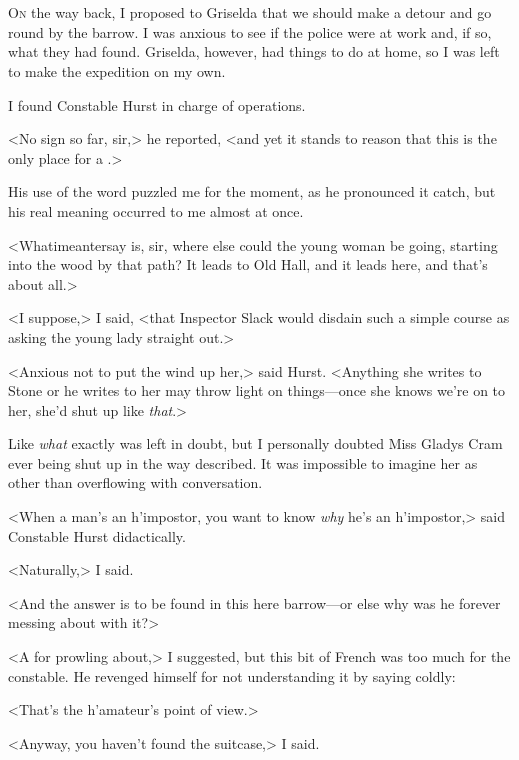 \chapter[Chapter  \thechapter]{}


\lettrine{O}{n} the way back, I proposed to Griselda that we should make a detour and go round by the barrow. I was anxious to see if the police were at work and, if so, what they had found. Griselda, however, had things to do at home, so I was left to make the expedition on my own.

I found Constable Hurst in charge of operations.

<No sign so far, sir,> he reported, <and yet it stands to reason that this is the only place for a .>

His use of the word  puzzled me for the moment, as he pronounced it catch, but his real meaning occurred to me almost at once.

<Whatimeantersay is, sir, where else could the young woman be going, starting into the wood by that path? It leads to Old Hall, and it leads here, and that's about all.>

<I suppose,> I said, <that Inspector Slack would disdain such a simple course as asking the young lady straight out.>

<Anxious not to put the wind up her,> said Hurst. <Anything she writes to Stone or he writes to her may throw light on things—once she knows we're on to her, she'd shut up like \emph{that}.>

Like \emph{what} exactly was left in doubt, but I personally doubted Miss Gladys Cram ever being shut up in the way described. It was impossible to imagine her as other than overflowing with conversation.

<When a man's an h'impostor, you want to know \emph{why} he's an h'impostor,> said Constable Hurst didactically.

<Naturally,> I said.

<And the answer is to be found in this here barrow—or else why was he forever messing about with it?>

<A  for prowling about,> I suggested, but this bit of French was too much for the constable. He revenged himself for not understanding it by saying coldly:

<That's the h'amateur's point of view.>

<Anyway, you haven't found the suitcase,> I said.

